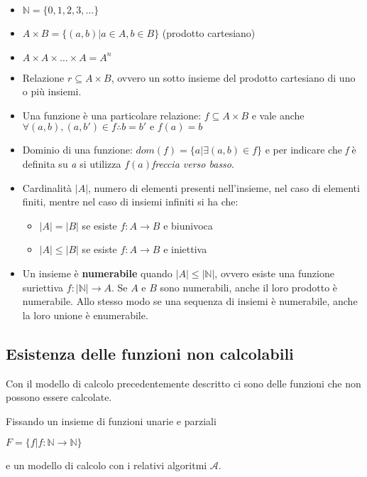 \begin{itemize}
\item
  $ \mathbb{N}= \{0,1,2,3,\ldots{}\}$
\item
  $A \times B = \{(a,b) | a \in A, b \in B\}$ (prodotto cartesiano)
\item
  $A \times A \times \ldots \times A = A^n$
\item
  Relazione $r \subseteq A \times B$, ovvero un sotto insieme del prodotto
  cartesiano di uno o più insiemi.
\item
  Una funzione è una particolare relazione: $f \subseteq A \times B$ e vale anche
  $\forall(a,b), (a,b') \in f \therefore b = b' \text{ e } f(a) = b$
\item
  Dominio di una funzione: $dom(f) = \{a | \exists (a,b) \in f\}$ e
  per indicare che \textit{f} è definita su \textit{a} si utilizza $f(a)$\emph{freccia verso
  basso}.
\item
  Cardinalità $|A|$, numero di elementi presenti
  nell'insieme, nel caso di elementi finiti, mentre nel caso di insiemi
  infiniti si ha che:

  \begin{itemize}
  \item $|A| = |B|$ se esiste $f: A \rightarrow B$ e biunivoca
  \item $|A| \leq |B|$ se esiste $f: A \rightarrow B$ e iniettiva
  \end{itemize}
\item
  Un insieme è \textbf{numerabile} quando $|A| \leq |\mathbb{N}|$, ovvero esiste una funzione suriettiva $f: |\mathbb{N}| \rightarrow A$. 
  Se $ A $ e $ B $ sono numerabili, anche il
  loro prodotto è numerabile. Allo stesso modo se una sequenza di
  insiemi è numerabile, anche la loro unione è enumerabile.
\end{itemize}

\subsection{Esistenza delle funzioni non calcolabili}\label{esistenza-delle-funzioni-non-calcolabili}

Con il modello di calcolo precedentemente descritto ci sono delle
funzioni che non possono essere calcolate.

Fissando un insieme di funzioni unarie e parziali

$ F = \{f | f: \mathbb{N} \rightarrow \mathbb{N}\}$

e un modello di calcolo con i relativi algoritmi $\mathcal{A}$.

